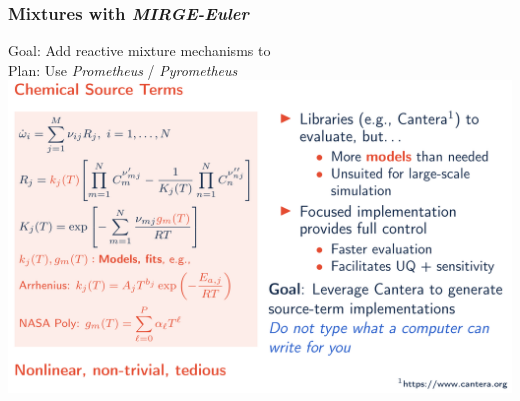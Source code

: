 %  
%  
%  

\begin{frame}\frametitle{Mixtures with \textit{MIRGE-Euler}}
  \begin{center}
  Goal: Add reactive mixture mechanisms to \mirgecom{}\\
  Plan: Use \textit{Prometheus} / \textit{Pyrometheus}\\
  \includegraphics[width=.8\textwidth]{figures/mtc/Prometheus1.png}
  \\
  \end{center}
\end{frame}

